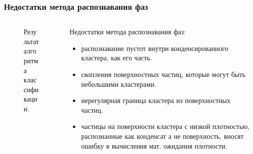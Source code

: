 \documentclass[pdf,hyperref={unicode}]{beamer}
\begin{document}
\begin{frame}
\transdissolve[duration=0.2]
\frametitle{Недостатки метода распознавания фаз}

\begin{columns}

\begin{column}{0.47\linewidth}
{
\begin{figure}[h]
\caption{\tiny Результат алгоритма классификации.}
\end{figure}
}
\end{column}


\begin{column}{0.47\linewidth}
{\tiny{
Недостатки метода распознавания фаз:
\begin{itemize}
\item распознавание пустот внутри конденсированного кластера, как его часть.
\item скопления поверхностных частиц, которые могут быть небольшими кластерами.
\item нерегулярная граница кластера из поверхностных частиц.
\item частицы на поверхности кластера с низкой плотностью, распознанные как конденсат а не поверхность, вносят ошибку в вычисления мат. ожидания плотности.
\end{itemize}
}}
\end{column}

\end{columns}

\end{frame}
\end{document}
